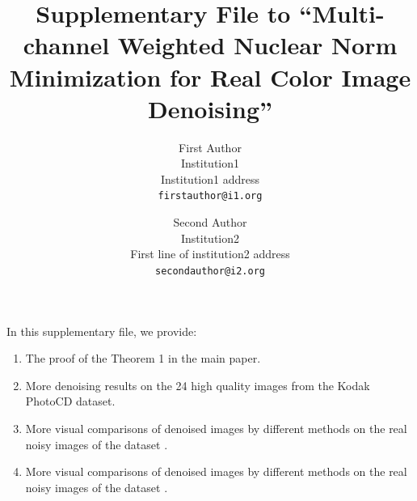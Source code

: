 \documentclass[10pt,onecolumn,letterpaper]{article}
\begin{document}
\title{Supplementary File to ``Multi-channel Weighted Nuclear Norm Minimization for Real Color Image Denoising''}

\author{First Author\\
Institution1\\
Institution1 address\\
{\tt\small firstauthor@i1.org}
\and
Second Author\\
Institution2\\
First line of institution2 address\\
{\tt\small secondauthor@i2.org}
}

\maketitle


In this supplementary file, we provide:\vspace{-2mm}
\begin{enumerate}
\item The proof of the Theorem 1 in the main paper.
\vspace{-2mm}
\item More denoising results on the 24 high quality images from the Kodak PhotoCD dataset.\vspace{-2mm}
\item More visual comparisons of denoised images by different methods on the real noisy images of the dataset \cite{ncwebsite}. \vspace{-2mm}
\item More visual comparisons of denoised images by different methods on the real noisy images of the dataset \cite{crosschannel2016}.
\end{enumerate}
\end{document}
